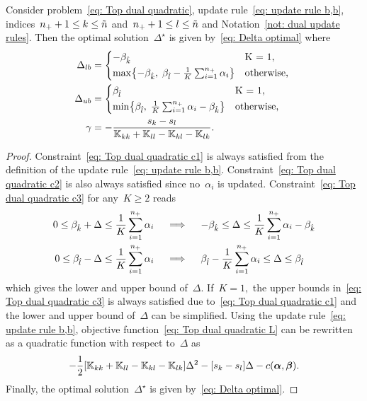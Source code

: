 \begin{lemma}\label{thm: toppushk family quadratic update b,b}
  Consider problem~\eqref{eq: Top dual quadratic}, update rule~\eqref{eq: update rule b,b}, indices~$n_{+} + 1 \leq k \leq \tilde{n}$ and~$n_{+} + 1 \leq l \leq \tilde{n}$  and Notation~\ref{not: dual update rules}. Then the optimal solution~$\Delta^{\star}$ is given by~\eqref{eq: Delta optimal} where
  \begin{align*}
    \Delta_{lb} & = 
      \begin{cases*}
        -\betak & K = 1, \\
        \max \Brac[c]{- \betak,\; \betal - \frac{1}{K} \sum_{i = 1}^{\npos} \alpha_i} & \textrm{otherwise},
      \end{cases*} \\
    \Delta_{ub} & = 
      \begin{cases*}
        \betal & K = 1, \\
        \min \Brac[c]{\betal,\; \frac{1}{K} \sum_{i = 1}^{\npos} \alpha_i - \betak} & \textrm{otherwise},
      \end{cases*} \\
    \gamma & = -\frac{s_k - s_l}{\K_{kk} + \K_{ll} - \K_{kl} - \K_{lk}}.
  \end{align*}
\end{lemma}

\begin{proof}
  Constraint~\eqref{eq: Top dual quadratic c1} is always satisfied from the definition of the update rule~\eqref{eq: update rule b,b}. Constraint~\eqref{eq: Top dual quadratic c2} is also always satisfied since no~$\alpha_i$ is updated. Constraint~\eqref{eq: Top dual quadratic c3} for any~$K \geq 2$ reads
  \begin{align*}
    0 \leq \beta_{\hat{k}} + \Delta \leq \frac{1}{K} \sum_{i = 1}^{n_{+}} \alpha_i 
    & \quad \implies \quad
    -\beta_{\hat{k}} \leq \Delta \leq \frac{1}{K} \sum_{i = 1}^{n_{+}} \alpha_i - \beta_{\hat{k}} \\
    0 \leq \beta_{\hat{l}} - \Delta \leq \frac{1}{K} \sum_{i = 1}^{n_{+}} \alpha_i
    & \quad \implies \quad
    \beta_{\hat{l}} - \frac{1}{K} \sum_{i = 1}^{n_{+}} \alpha_i \leq \Delta \leq \beta_{\hat{l}}
  \end{align*}
  which gives the lower and upper bound of~$\Delta.$ If~$K = 1,$ the upper bounds in~\eqref{eq: Top dual quadratic c3} is always satisfied due to~\eqref{eq: Top dual quadratic c1} and the lower and upper bound of~$\Delta$ can be simplified. Using the update rule~\eqref{eq: update rule b,b}, objective function~\eqref{eq: Top dual quadratic L} can be rewritten as a quadratic function with respect to~$\Delta$ as
  \begin{equation*}
    - \frac{1}{2} \Brac[s]{\K_{kk} + \K_{ll} - \K_{kl} - \K_{lk}} \Delta^2
    - \Brac[s]{s_k - s_l} \Delta
    - c(\bm{\alpha}, \bm{\beta}).
  \end{equation*}
  Finally, the optimal solution~$\Delta^{\star}$ is given by~\eqref{eq: Delta optimal}.
\end{proof}


